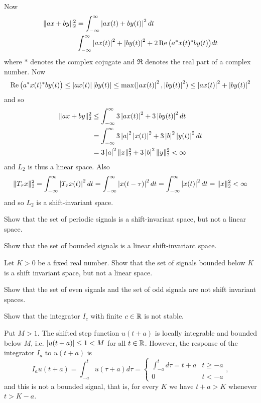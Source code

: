 \begin{excersizelist}
\begin{solution}
Now
\begin{align*}
\|a x + b y\|_2^2 &= \int_{-\infty}^\infty \left\vert ax(t) + by(t) \right\vert^2 dt \\
& \int_{-\infty}^\infty \left\vert a x(t) \right\vert^2 + \left\vert  b y(t) \right\vert^2 + 2 \operatorname{Re}\big( a^* x(t)^* b y(t) \big) dt
\end{align*}
where $*$ denotes the complex cojugate and $\Re$ denotes the real part of a complex number.  Now
\[
\operatorname{Re}\big( a^* x(t)^* b y(t) \big) \leq \left\vert a x(t) \right\vert \left\vert b y(t) \right\vert \leq \max(\left\vert a x(t) \right\vert^2, \left\vert b y(t) \right\vert^2) \leq \left\vert a x(t) \right\vert^2 + \left\vert b y(t) \right\vert^2
\]
and so
\begin{align*}
\|a x + b y\|_2^2 &\leq \int_{-\infty}^\infty 3\left\vert a x(t) \right\vert^2 + 3\left\vert  b y(t) \right\vert^2 dt \\
&= \int_{-\infty}^\infty 3\left\vert a \right\vert^2\left\vert x(t) \right\vert^2 + 3\left\vert b \right\vert^2\left\vert  y(t) \right\vert^2 dt \\
&= 3 \left\vert a \right\vert^2 \|x\|_2^2 + 3 \left\vert b \right\vert^2 \|y\|_2^2 < \infty
\end{align*}
and $L_2$ is thus a linear space.  Also
\[
\|T_\tau x\|_2^2 = \int_{-\infty}^\infty \left\vert  T_\tau x(t)  \right\vert^2 dt = \int_{-\infty}^\infty \left\vert x(t - \tau) \right\vert^2 dt = \int_{-\infty}^\infty \left\vert x(t) \right\vert^2 dt = \|x\|_2^2 < \infty
\]
and so $L_2$ is a shift-invariant space.
\end{solution}

\item \label{exer:periodicshiftinvariantnotlinear} Show that the set of periodic signals is a shift-invariant space, but not a linear space.

\item \label{exer:boundedlinearshiftinvar} Show that the set of bounded signals is a linear shift-invariant space.

\item \label{exer:boundconstantnotlinear} Let $K > 0$ be a fixed real number. Show that the set of signals bounded below $K$ is a shift invariant space, but not a linear space. 

\item \label{exer:evenoddnoshiftinvariant} Show that the set of even signals and the set of odd signals are not shift invariant spaces.

\item \label{excer:integratornotstable1} Show that the integrator $I_c$ with finite $c\in{\mathbb R}$ is not stable.
\begin{solution}
Put $M > 1$.  The shifted step function $u(t + a)$ is locally integrable and bounded below $M$, i.e. $\vert u(t+a) \vert \leq 1 < M$ for all $t \in {\mathbb R}$.  However, the response of the integrator $I_a$ to $u(t+a)$ is
\[
I_au(t+a) = \int_{-a}^t u(\tau + a)d\tau = \begin{cases}
\int_{-a}^t d\tau = t + a & t \geq -a \\
0 & t < -a 
\end{cases},
\]
and this is not a bounded signal, that is, for every $K$ we have $t + a > K$ whenever $t > K - a$.
\end{solution}


\end{excersizelist}

